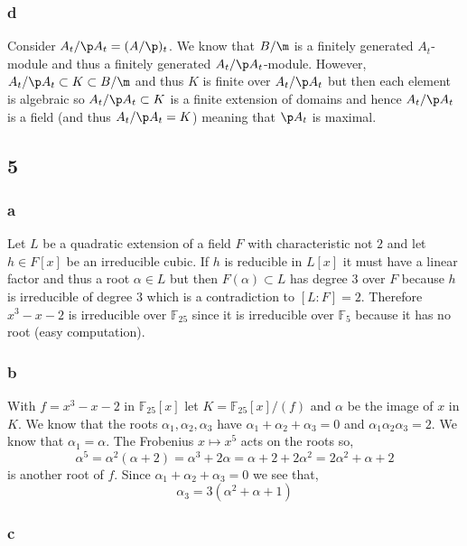 \documentclass[12pt]{article}
\renewcommand{\F}{\mathbb{F}}
\begin{document}
\subsubsection{d}

Consider $A_t / \p A_t = (A / \p)_t$. We know that $B/\m$ is a finitely generated $A_t$-module and thus a finitely generated $A_t / \p A_t$-module. However, $A_t / \p A_t \subset K \subset B / \m$ and thus $K$ is finite over $A_t / \p A_t$ but then each element is algebraic so $A_t / \p A_t \subset K$ is a finite extension of domains and hence $A_t / \p A_t$ is a field (and thus $A_t / \p A_t = K$) meaning that $\p A_t$ is maximal.

\subsection{5}

\subsubsection{a}

Let $L$ be a quadratic extension of a field $F$ with characteristic not $2$ and let $h \in F[x]$ be an irreducible cubic. If $h$ is reducible in $L[x]$ it must have a linear factor and thus a root $\alpha \in L$ but then $F(\alpha) \subset L$ has degree $3$ over $F$ because $h$ is irreducible of degree $3$ which is a contradiction to $[L : F] = 2$. Therefore $x^3 - x - 2$ is irreducible over $\F_{25}$ since it is irreducible over $\F_5$ because it has no root (easy computation). 

\subsubsection{b}

With $f = x^3 - x - 2$ in $\F_{25}[x]$ let $K = \F_{25}[x]/(f)$ and $\alpha$ be the image of $x$ in $K$. We know that the roots $\alpha_1, \alpha_2, \alpha_3$ have $\alpha_1 + \alpha_2 + \alpha_3 = 0$ and $\alpha_1 \alpha_2 \alpha_3 = 2$. We know that $\alpha_1 = \alpha$. The Frobenius $x \mapsto x^5$ acts on the roots so,
\[ \alpha^5 = \alpha^2 (\alpha + 2) = \alpha^3 + 2 \alpha = \alpha + 2 + 2 \alpha^2 = 2 \alpha^2 + \alpha  + 2 \]
is another root of $f$. Since $\alpha_1 + \alpha_2 + \alpha_3 = 0$ we see that,
\[ \alpha_3 = 3 (\alpha^2 + \alpha + 1) \] 

\subsubsection{c}
\end{document}
